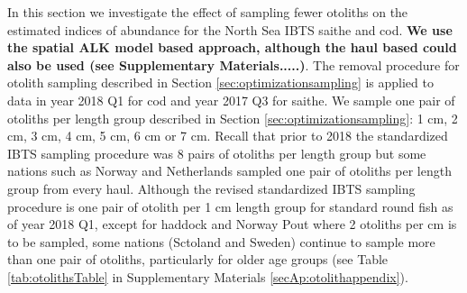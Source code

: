 \documentclass[a4paper 12pt]{article}
\numberwithin{equation}{section}
\begin{document}
{%

In this section we investigate the effect of sampling fewer otoliths on the estimated indices of abundance for the North Sea IBTS saithe and cod. {\bf We use the spatial ALK model based approach, although the haul based could also be used (see Supplementary Materials.....)}. The removal procedure for otolith sampling described in Section \ref{sec:optimizationsampling} is applied to data in year 2018 Q1 for cod and year 2017 Q3 for saithe. We sample one pair of otoliths per length group described in Section \ref{sec:optimizationsampling}: 1 cm, 2 cm, 3 cm, 4 cm, 5 cm, 6 cm or 7 cm. Recall that prior to 2018 the standardized IBTS sampling procedure was 8 pairs of otoliths per length group but some nations such as Norway and Netherlands sampled one pair of otoliths per length group from every haul. Although the revised standardized IBTS sampling procedure is one pair of otolith per 1 cm length group for standard round fish as of year 2018 Q1, except for haddock and Norway Pout where 2 otoliths per cm is to be sampled, some nations (Sctoland and Sweden) continue to sample more than one pair of otoliths, particularly for older age groups (see Table \ref{tab:otolithsTable} in Supplementary Materials \ref{secAp:otolithappendix}).

}
\end{document}
